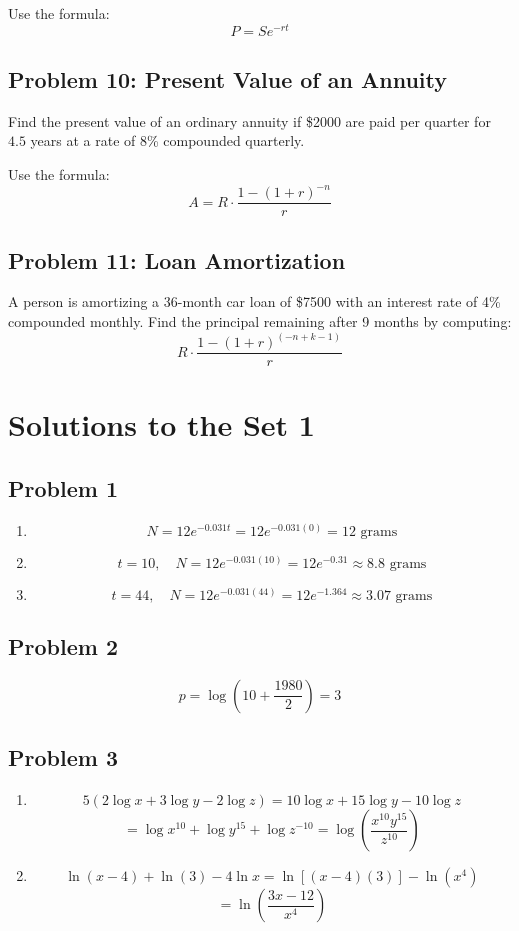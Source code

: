 \documentclass[12pt]{article}
\begin{document}
Use the formula:
\[
P = Se^{-rt}
\]

\subsection*{Problem 10: Present Value of an Annuity}
Find the present value of an ordinary annuity if \$2000 are paid per quarter for \( 4.5 \) years at a rate of 8\% compounded quarterly.

Use the formula:
\[
A = R \cdot \dfrac{1 - (1 + r)^{-n}}{r}
\]

\subsection*{Problem 11: Loan Amortization}
A person is amortizing a 36-month car loan of \$7500 with an interest rate of 4\% compounded monthly. Find the principal remaining after 9 months by computing:
\[
R \cdot \dfrac{1 - (1 + r)^{(-n + k - 1)}}{r}
\]


\newpage
\section*{Solutions to the Set 1}

\subsection*{Problem 1}
\begin{enumerate}[label=(\alph*)]
    \item 
    \[
    N = 12e^{-0.031t} = 12e^{-0.031(0)} = \boxed{12 \text{ grams}}
    \]

    \item 
    \[
    t = 10,\quad N = 12e^{-0.031(10)} = 12e^{-0.31} \approx \boxed{8.8 \text{ grams}}
    \]

    \item 
    \[
    t = 44,\quad N = 12e^{-0.031(44)} = 12e^{-1.364} \approx \boxed{3.07 \text{ grams}}
    \]
\end{enumerate}

\subsection*{Problem 2}
\[
p = \log\left(10 + \dfrac{1980}{2}\right) = \boxed{3}
\]

\subsection*{Problem 3}
\begin{enumerate}[label=(\alph*)]
    \item 
    \[
    5\left(2\log x + 3\log y - 2\log z\right) = 10\log x + 15\log y - 10\log z
    \]
    \[
    = \log x^{10} + \log y^{15} + \log z^{-10}
    = \log\left(\dfrac{x^{10} y^{15}}{z^{10}}\right)
    \]

    \item 
    \[
    \ln(x - 4) + \ln(3) - 4\ln x 
    = \ln\left[(x - 4)(3)\right] - \ln(x^4)
    \]
    \[
    = \ln\left(\dfrac{3x - 12}{x^4}\right)
    \]
\end{enumerate}
\end{document}
